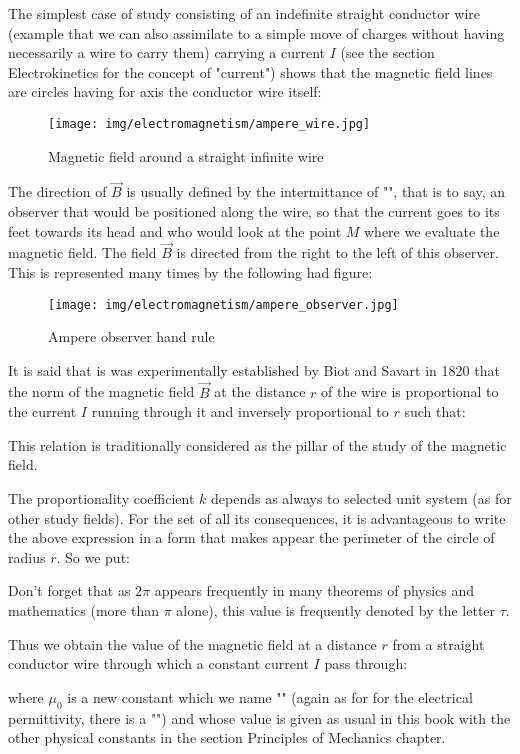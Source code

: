 	The simplest case of study consisting of an indefinite straight conductor wire (example that we can also assimilate to a simple move of charges without having necessarily a wire to carry them) carrying a current $I$ (see the section Electrokinetics for the concept of "current") shows that the magnetic field lines are circles having for axis the conductor wire itself:
	\begin{figure}[H]
		\centering
		\texttt{[image: img/electromagnetism/ampere\_wire.jpg]}
		\caption{Magnetic field around a straight infinite wire}
	\end{figure}
	The direction of $\vec{B}$ is usually defined by the intermittance of "", that is to say, an observer that would be positioned along the wire, so that the current goes to its feet towards its head and who would look at the point $M$ where we evaluate the magnetic field. The field $\vec{B}$ is directed from the right to the left of this observer. This is represented many times by the following had figure:
	\begin{figure}[H]
		\centering
		\texttt{[image: img/electromagnetism/ampere\_observer.jpg]}
		\caption{Ampere observer hand rule}
	\end{figure}
	It is said that is was experimentally established by Biot and Savart in 1820 that the norm of the magnetic field $\vec{B}$ at the distance $r$ of the wire is proportional to the current $I$ running through it and inversely proportional to $r$ such that:
	
	This relation is traditionally considered as the pillar of the study of the magnetic field.
	
	The proportionality coefficient $k$ depends as always to selected unit system (as for other study fields). For the set of all its consequences, it is advantageous to write the above expression in a form that makes appear the perimeter of the circle of radius $r$. So we put:
	
	\begin{tcolorbox}[title=Remark,colframe=black,arc=10pt]
	Don't forget that as $2\pi$ appears frequently in many theorems of physics and mathematics (more than $\pi$ alone), this value is frequently denoted by the letter $\tau$.
	\end{tcolorbox}
	Thus we obtain the value of the magnetic field at a distance $r$ from a straight conductor wire through which a constant current $I$ pass through:
	
	where $\mu_0$ is a new constant which we name "" (again as for for the electrical permittivity, there is a "") and whose value is given as usual in this book with the other physical constants in the section Principles of Mechanics chapter.
	
